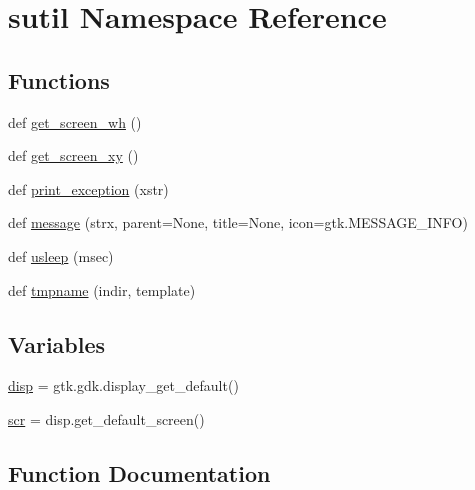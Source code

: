 \hypertarget{namespacesutil}{}\section{sutil Namespace Reference}
\label{namespacesutil}
\subsection*{Functions}
\begin{DoxyCompactItemize}
\item 
def \hyperlink{namespacesutil_a358f6cac4a7c434457d1b1b1d9e972e7}{get\+\_\+screen\+\_\+wh} ()
\item 
def \hyperlink{namespacesutil_a70f48a37a4146473048aa0cc60885a7d}{get\+\_\+screen\+\_\+xy} ()
\item 
def \hyperlink{namespacesutil_ac2f54c225674ebc1e9db28d0af8b31e6}{print\+\_\+exception} (xstr)
\item 
def \hyperlink{namespacesutil_a55329686e169a9e2c0e28cef5dd6b280}{message} (strx, parent=None, title=None, icon=gtk.\+M\+E\+S\+S\+A\+G\+E\+\_\+\+I\+N\+FO)
\item 
def \hyperlink{namespacesutil_a85b8fdf62f2f3a32f0492bd3ccefa210}{usleep} (msec)
\item 
def \hyperlink{namespacesutil_a05bce0450fed5500a47807276f44b7af}{tmpname} (indir, template)
\end{DoxyCompactItemize}
\subsection*{Variables}
\begin{DoxyCompactItemize}
\item 
\hyperlink{namespacesutil_a4e72583d972515f4f5e30d98ce1eb739}{disp} = gtk.\+gdk.\+display\+\_\+get\+\_\+default()
\item 
\hyperlink{namespacesutil_ad75a267a1da457e846243e557b3ac5bb}{scr} = disp.\+get\+\_\+default\+\_\+screen()
\end{DoxyCompactItemize}


\subsection{Function Documentation}
\mbox{\label{namespacesutil_a358f6cac4a7c434457d1b1b1d9e972e7}} 
